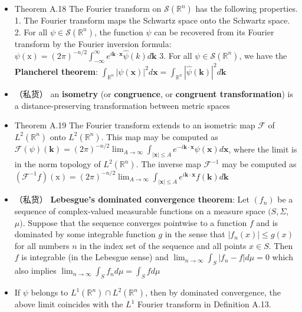 \begin{itemize}
\item Theorem A.18 The Fourier transform on $\mathcal{S}\left(\mathbb{R}^{n}\right)$ has the following properties.
1. The Fourier transform maps the Schwartz space onto the Schwartz space.
2. For all $\psi \in \mathcal{S}\left(\mathbb{R}^{n}\right)$, the function $\psi$ can be recovered from its Fourier transform by the Fourier inversion formula: $\psi(\mathrm{x})=(2 \pi)^{-n / 2} \int_{-\infty}^{\infty} e^{i \mathbf{k} \cdot \mathbf{x}} \hat{\psi}(k) d \mathbf{k}$
3. For all $\psi \in \mathcal{S}\left(\mathbb{R}^{n}\right)$, we have the \textbf{Plancherel theorem}: $\int_{\mathbb{R}^{n}}|\psi(\mathbf{x})|^{2} d \mathbf{x}=\int_{\mathbb{R}^{n}}|\hat{\psi}(\mathbf{k})|^{2} d \mathbf{k}$

\item （私货） an \textbf{isometry} (or \textbf{congruence}, or \textbf{congruent transformation}) is a distance-preserving transformation between metric spaces

\item Theorem A.19 The Fourier transform extends to an isometric map $\mathcal{F}$ of $L^{2}\left(\mathbb{R}^{n}\right)$ onto $L^{2}\left(\mathbb{R}^{n}\right)$. This map may be computed as $\mathcal{F}(\psi)(\mathbf{k})=(2 \pi)^{-n / 2} \lim _{A \rightarrow \infty} \int_{|\mathbf{x}| \leq A} e^{-i \mathbf{k} \cdot \mathbf{x}} \psi(\mathbf{x}) d \mathbf{x}$, where the limit is in the norm topology of $L^{2}\left(\mathbb{R}^{n}\right)$. The inverse map $\mathcal{F}^{-1}$ may be computed as $\left(\mathcal{F}^{-1} f\right)(\mathrm{x})=(2 \pi)^{-n / 2} \lim _{A \rightarrow \infty} \int_{|\mathbf{x}| \leq A} e^{i \mathbf{k} \cdot \mathbf{x}} f(\mathbf{k}) d \mathbf{k}$

\item （私货） \textbf{Lebesgue's dominated convergence theorem}: Let $\left(f_{n}\right)$ be a sequence of complex-valued measurable functions on a measure space $(S, \Sigma$, $\mu)$. Suppose that the sequence converges pointwise to a function $f$ and is dominated by some integrable function $g$ in the sense that $\left|f_{n}(x)\right| \leq g(x)$ for all numbers $n$ in the index set of the sequence and all points $x \in S$. Then $f$ is integrable (in the Lebesgue sense) and
$\lim _{n \rightarrow \infty} \int_{S}\left|f_{n}-f\right| d \mu=0$ which also implies $\lim _{n \rightarrow \infty} \int_{S} f_{n} d \mu=\int_{S} f d \mu$

\item If $\psi$ belongs to $L^{1}\left(\mathbb{R}^{n}\right) \cap L^{2}\left(\mathbb{R}^{n}\right)$, then by dominated convergence, the above limit coincides with the $L^{1}$ Fourier transform in Definition A.13.


\end{itemize}
